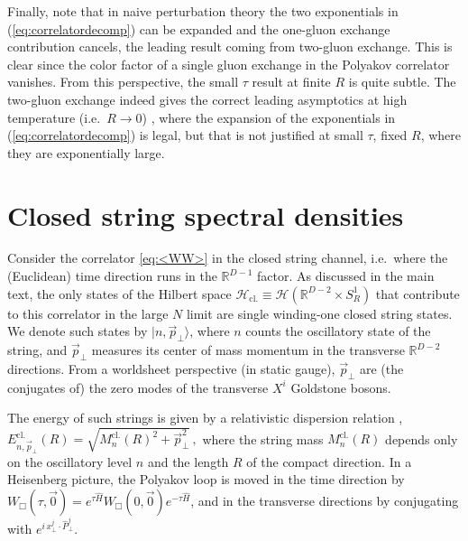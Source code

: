 \documentclass[
 reprint,
 amsmath,
 pre,
 amssymb,
 nofootinbib,
 aps,
 longbibliography,
]{revtex4-1}
\newcommand{\<}{{\langle}}
\renewcommand{\>}{{\rangle}}
\begin{document}
Finally, note that in naive perturbation theory the two exponentials in (\ref{eq:correlatordecomp}) can be expanded and the one-gluon exchange contribution cancels, the leading result coming from two-gluon exchange. This is clear since the color factor of a single gluon exchange in the Polyakov correlator vanishes. From this perspective, the small $\tau$ result at finite $R$ is quite subtle. The two-gluon exchange indeed gives the correct leading asymptotics at high temperature (i.e.\ $R\to 0$) \cite{Nadkarni:1986cz}, where the expansion of the exponentials in (\ref{eq:correlatordecomp}) is legal, but that is not justified at small $\tau$, fixed $R$, where they are exponentially large.

\vspace{-0.1 in}
\section{Closed string spectral densities}\label{app:rhos}
Consider the correlator \eqref{eq:<WW>} in the closed string channel, i.e.\ where the (Euclidean) time direction runs in the $\mathbb R^{D-1}$ factor. As discussed in the main text, the only states of the Hilbert space $\mathcal H_\text{cl.}\equiv\mathcal H(\mathbb R^{D-2}\times S^1_R)$ that contribute to this correlator in the large $N$ limit are single winding-one closed string states. We denote such states by $|n,\vec p_\bot\rangle$, where $n$ counts the oscillatory state of the string, and $\vec p_\bot$ measures its center of mass momentum in the transverse $\mathbb R^{D-2}$ directions. From a worldsheet perspective (in static gauge), $\vec p_\bot$ are (the conjugates of) the zero modes of the transverse $X^i$ Goldstone bosons.

The energy of such strings is given by a relativistic dispersion relation \cite{Meyer:2006qx}, $
    E^{\text{cl.}}_{n,\vec p_\bot}(R) = \sqrt{M^{\text{cl.}}_n(R)^2 + \vec p_\bot^2}\,,
$
where the string mass $M^{\text{cl.}}_n(R)$ depends only on the oscillatory level $n$ and the length $R$ of the compact direction.
In a Heisenberg picture, the Polyakov loop is moved in the time direction by $W_{\Box}(\tau,\vec 0) = e^{\tau \widehat H}W_{\Box}(0,\vec 0)e^{-\tau \widehat H}$, and in the transverse directions by conjugating with $e^{i\, x_\bot^j \cdot \widehat{P}_\bot^j}$.
\end{document}
